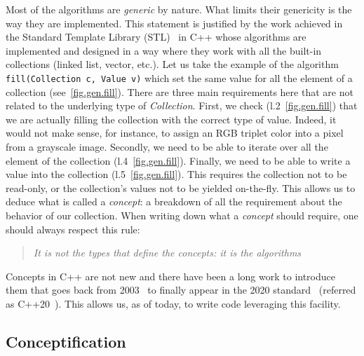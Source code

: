 Most of the algorithms are \emph{generic} by nature. What limits their genericity is the way they are implemented. This
statement is justified by the work achieved in the Standard Template Library (STL)~\parencite{dehnert.1998.fundamentals}
in C++ whose algorithms are implemented and designed in a way where they work with all the built-in collections (linked
list, vector, etc.). Let us take the example of the algorithm \texttt{fill(Collection c, Value v)} which set the same
value for all the element of a collection (see~\cref{fig.gen.fill}). There are three main requirements here that are not
related to the underlying type of \emph{Collection}. First, we check (l.2~\ref{fig.gen.fill}) that we are actually
filling the collection with the correct type of value. Indeed, it would not make sense, for instance, to assign an RGB
triplet color into a pixel from a grayscale image. Secondly, we need to be able to iterate over all the element of the
collection (l.4~\ref{fig.gen.fill}). Finally, we need to be able to write a value into the collection
(l.5~\ref{fig.gen.fill}). This requires the collection not to be read-only, or the collection's values not to be yielded
on-the-fly. This allows us to deduce what is called a \emph{concept}: a breakdown of all the requirement about the
behavior of our collection. When writing down what a \emph{concept} should require, one should always respect this rule:
\blockquote{\emph{It is not the types that define the concepts: it is the algorithms}}. Concepts in C++ are not new and
there have been a long work to introduce them that goes back from
2003~\parencite{seymour.2009.concepts,stroustrup.2003.concepts,sutton.2017.concepts} to finally appear in the 2020
standard~\cite{voutilainen.2017.concepts} (referred as C++20~\parencite{iso.2011.cpp}). This allows us, as of today, to
write code leveraging this facility.

\subsection{Conceptification}
\label{genericity.postcpp11.subsec.conceptification}

